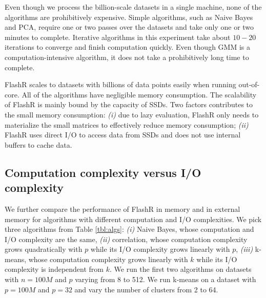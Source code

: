 Even though we process the billion-scale datasets in a single machine, none of
the algorithms are prohibitively expensive. Simple algorithms, such as
Naive Bayes and PCA, require one or two passes over the datasets and take
only one or two minutes to complete. Iterative algorithms in this experiment
take about $10-20$ iterations to converge and finish computation quickly.
Even though GMM is a computation-intensive algorithm, it does not take
a prohibitively long time to complete.

FlashR scales to datasets with billions of data points easily when running
out-of-core. All of the algorithms have negligible memory consumption.
The scalability of FlashR is mainly bound by the capacity of SSDs.
Two factors contributes to the small memory consumption: \textit{(i)}
due to lazy evaluation, FlashR only needs to materialize the small matrices
to effectively reduce memory consumption; \textit{(ii)} FlashR uses
direct I/O to access data from SSDs and does not use internal buffers
to cache data.

\subsection{Computation complexity versus I/O complexity}
We further compare the performance of FlashR in memory and in external memory
for algorithms with different computation and I/O complexities.
We pick three algorithms from Table \ref{tbl:algs}: \textit{(i)} Naive Bayes,
whose computation and I/O complexity are the same, \textit{(ii)}
correlation, whose computation complexity grows quadratically with $p$ while
its I/O complexity grows linearly with $p$, \textit{(iii)} k-means, whose computation
complexity grows linearly with $k$ while its I/O complexity is independent
from $k$. We run the first two algorithms on datasets with $n=100M$ and $p$
varying from 8 to 512. We run k-means on a dataset with $p=100M$ and $p=32$
and vary the number of clusters from 2 to 64.

